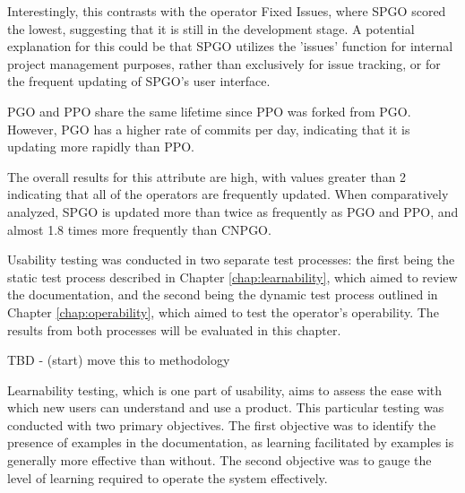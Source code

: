 Interestingly, this contrasts with the operator Fixed Issues, where SPGO scored the lowest, suggesting that it is still in the development stage.
A potential explanation for this could be that SPGO utilizes the 'issues' function for internal project management purposes,
rather than exclusively for issue tracking, or for the frequent updating of SPGO’s user interface.

PGO and PPO share the same lifetime since PPO was forked from PGO. However, PGO has a higher rate of commits per day, indicating that it is updating more rapidly than PPO.

The overall results for this attribute are high, with values greater than 2 indicating that all of the operators are frequently updated.
When comparatively analyzed, SPGO is updated more than twice as frequently as PGO and PPO, and almost 1.8 times more frequently than CNPGO.


Usability testing was conducted in two separate test processes: the first being the static test process described in Chapter \ref{chap:learnability}, which aimed to review the documentation,
and the second being the dynamic test process outlined in Chapter \ref{chap:operability}, which aimed to test the operator's operability.
The results from both processes will be evaluated in this chapter.

TBD - (start) move this to methodology

Learnability testing, which is one part of usability, aims to assess the ease with which new users can understand and use a product. This particular testing was conducted with two primary objectives. The first objective was to identify the presence of examples in the documentation, as learning facilitated by examples is generally more effective than without. The second objective was to gauge the level of learning required to operate the system effectively.


